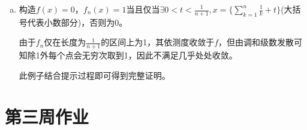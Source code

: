 \documentclass[a4paper,UTF8,fontset=windows]{ctexart}
\begin{document}
\begin{enumerate}[(1)]
\begin{enumerate}[(a)]
    \item
    构造$f(x)=0$，$f_n(x)=1$当且仅当$\exists 0<t<\frac{1}{n+1},x=\{\sum_{k=1}^{n}\frac{1}{k}+t\}$(大括号代表小数部分)，否则为0。
    
    由于$f_n$仅在长度为$\frac{1}{n+1}$的区间上为1，其依测度收敛于$f$，但由调和级数发散可知除1外每个点会无穷次取到1，因此不满足几乎处处收敛。
    
    此例子结合提示过程即可得到完整证明。
    \end{enumerate}
\end{enumerate}

\section{第三周作业}
\subsection{}
\end{document}
